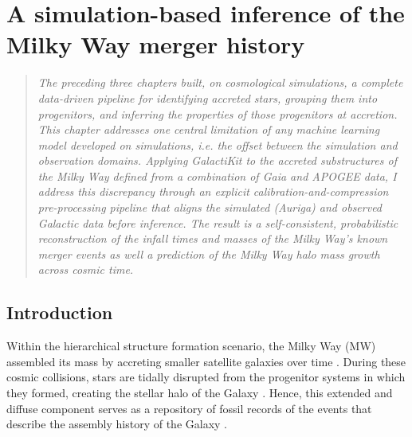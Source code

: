 ﻿%
\graphicspath{{Chapter_5_paper_folder/}}


\chapter{A simulation-based inference of the Milky Way merger history}
\label{chap:chapter5}

\begin{quote}
\itshape
The preceding three chapters built, on cosmological simulations, a complete data-driven pipeline for identifying
accreted stars, grouping them into progenitors, and inferring the properties of
those progenitors at accretion. This chapter addresses one central limitation of any
machine learning model developed on simulations, i.e. the offset between the simulation
and observation domains. Applying GalactiKit to the accreted substructures of the Milky Way defined
from a combination of Gaia and APOGEE data, I address this discrepancy through an explicit calibration-and-compression
pre-processing pipeline that aligns the simulated (Auriga) and observed Galactic data
before inference.
The result is a self-consistent, probabilistic reconstruction of the infall times and
masses of the Milky Way's known merger events as well a prediction of the Milky Way
halo mass growth across cosmic time.
\end{quote}

\section{Introduction}

Within the hierarchical structure formation scenario, the Milky Way (MW) assembled its mass by accreting smaller satellite galaxies over time \citep{White1978}. During these cosmic collisions, stars are tidally disrupted from the progenitor systems in which they formed, creating the stellar halo of the Galaxy \citep{Searle1978,Johnston1996}. Hence, this extended and diffuse component serves as a repository of fossil records of the events that describe the assembly history of the Galaxy \citep{Helmi2020,Deason2024,Bonaca2025}. 


